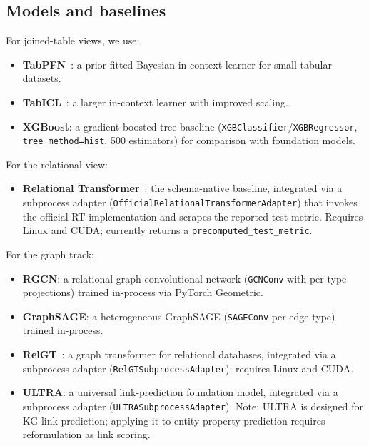 \documentclass[11pt]{article}
\begin{document}
\subsection{Models and baselines}

For joined-table views, we use:
\begin{itemize}
  \item \textbf{TabPFN}~\citep{tabpfn}: a prior-fitted Bayesian
        in-context learner for small tabular datasets.
  \item \textbf{TabICL}~\citep{tabicl}: a larger in-context learner
        with improved scaling.
  \item \textbf{XGBoost}: a gradient-boosted tree baseline
        (\texttt{XGBClassifier}/\texttt{XGBRegressor}, \texttt{tree\_method=hist},
        500 estimators) for comparison with foundation models.
\end{itemize}

For the relational view:
\begin{itemize}
  \item \textbf{Relational Transformer}~\citep{rt}: the schema-native
        baseline, integrated via a subprocess adapter
        (\texttt{OfficialRelationalTransformerAdapter}) that invokes
        the official RT implementation and scrapes the reported test metric.
        Requires Linux and CUDA; currently returns a \texttt{precomputed\_test\_metric}.
\end{itemize}

For the graph track:
\begin{itemize}
  \item \textbf{RGCN}: a relational graph convolutional network
        (\texttt{GCNConv} with per-type projections) trained in-process
        via PyTorch Geometric.
  \item \textbf{GraphSAGE}: a heterogeneous GraphSAGE
        (\texttt{SAGEConv} per edge type) trained in-process.
  \item \textbf{RelGT}~\citep{relgt}: a graph transformer for
        relational databases, integrated via a subprocess adapter
        (\texttt{RelGTSubprocessAdapter}); requires Linux and CUDA.
  \item \textbf{ULTRA}: a universal link-prediction foundation model,
        integrated via a subprocess adapter (\texttt{ULTRASubprocessAdapter}).
        Note: ULTRA is designed for KG link prediction; applying it to
        entity-property prediction requires reformulation as link scoring.
\end{itemize}
\end{document}
